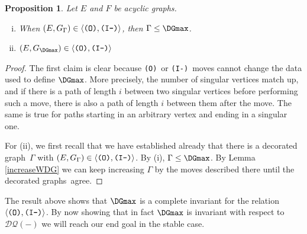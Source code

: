 \documentclass[12pt]{amsbook}%
\newtheorem{propo}[theor]{Proposition}
\theoremstyle{defin}
\theoremstyle{remark}
\numberwithin{equation}{chapter}
\numberwithin{theor}{section}
\newcommand{\IIIm}{\mbox{\texttt{\textup{(I-)}}}}
\newcommand{\OOO}{\mbox{\texttt{\textup{(O)}}}}
\newcommand{\DQ}{\mathcal{DQ}}
\newcommand{\DG}{decorated graph}
\newcommand{\DGs}{decorated graphs}
\begin{document}
\begin{propo}\label{maxinvariant}
Let $E$ and $F$ be acyclic graphs.
\begin{enumerate}[(i)]
\item When $(E,G_{\Gamma})\in\langle\OOO,\IIIm\rangle$, then $\Gamma\leq \DGmax$.
\item $(E,G_{\DGmax})\in\langle \OOO,\IIIm\rangle$
\end{enumerate}
\end{propo}
\begin{proof}
The first claim is clear because \OOO\ or \IIIm\ moves cannot change the data used to define $\DGmax$. More precisely, the number of singular vertices match up, and if there is a path of length $i$ between two singular vertices before performing such a move, there is also a path of length $i$ between them after the move. The same is true for paths starting in an arbitrary vertex and ending in a singular one.

For (ii), we first recall that we have established already that there  is a \DG\ $\Gamma$ with $(E,G_{\Gamma})\in \langle \OOO,\IIIm\rangle$. By (i), $\Gamma\leq \DGmax$. By Lemma \ref{increaseWDG} we can keep increasing $\Gamma$ by the moves described there until the \DGs\ agree.
\end{proof}


The result above shows that $\DGmax$ is a complete invariant for the relation $\langle\OOO,\IIIm\rangle$. By now showing that in fact $\DGmax$ is invariant with respect to $\DQ(-)$ we will reach our end goal in the stable case.
\end{document}
